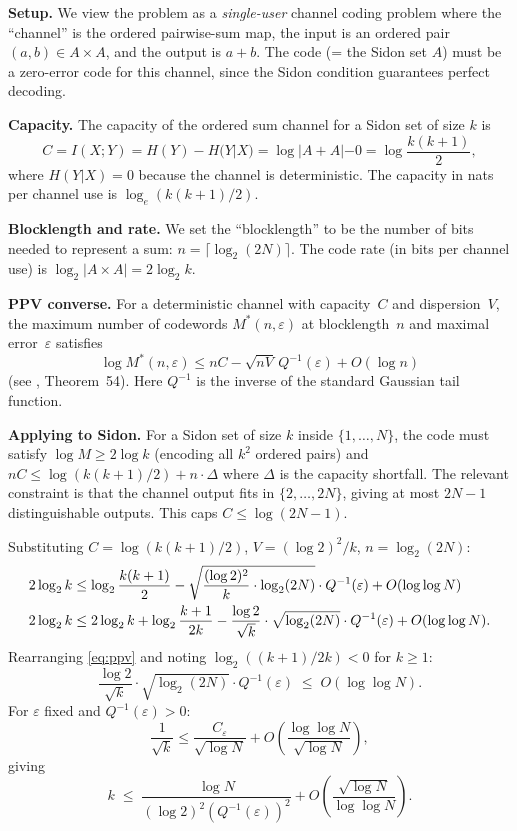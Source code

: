 \documentclass[11pt]{amsart}
\theoremstyle{plain}
\theoremstyle{definition}
\theoremstyle{remark}
\begin{document}
\textbf{Setup.} We view the problem as a \emph{single-user} channel coding
problem where the ``channel'' is the ordered pairwise-sum map, the input
is an ordered pair $(a,b) \in A \times A$, and the output is $a+b$.  The
code (= the Sidon set $A$) must be a zero-error code for this channel,
since the Sidon condition guarantees perfect decoding.

\textbf{Capacity.} The capacity of the ordered sum channel for a Sidon set
of size $k$ is
\[
  C = I(X;Y) = H(Y) - H(Y|X) = \log|A+A| - 0 = \log\frac{k(k+1)}{2},
\]
where $H(Y|X) = 0$ because the channel is deterministic.  The capacity in
nats per channel use is $\log_e(k(k+1)/2)$.

\textbf{Blocklength and rate.} We set the ``blocklength'' to be the number
of bits needed to represent a sum: $n = \lceil\log_2(2N)\rceil$.  The
code rate (in bits per channel use) is $\log_2|A \times A| = 2\log_2 k$.

\textbf{PPV converse.} For a deterministic channel with capacity~$C$ and
dispersion~$V$, the maximum number of codewords $M^*(n,\varepsilon)$ at
blocklength~$n$ and maximal error~$\varepsilon$ satisfies
\[
  \log M^*(n,\varepsilon) \le nC - \sqrt{nV}\,Q^{-1}(\varepsilon) + O(\log n)
\]
(see \cite{ppv_2010}, Theorem~54).  Here $Q^{-1}$ is the inverse of the
standard Gaussian tail function.

\textbf{Applying to Sidon.} For a Sidon set of size $k$ inside
$\{1,\ldots,N\}$, the code must satisfy $\log M \ge 2\log k$ (encoding
all $k^2$ ordered pairs) and $nC \le \log(k(k+1)/2) + n \cdot \Delta$
where $\Delta$ is the capacity shortfall.  The relevant constraint is that
the channel output fits in $\{2,\ldots,2N\}$, giving at most $2N-1$
distinguishable outputs.  This caps $C \le \log(2N-1)$.

Substituting $C = \log(k(k+1)/2)$, $V = (\log 2)^2/k$, $n = \log_2(2N)$:
\begin{align}
  2\log_2 k &\le \log_2\frac{k(k+1)}{2}
               - \sqrt{\frac{(\log 2)^2}{k} \cdot \log_2(2N)}\cdot Q^{-1}(\varepsilon)
               + O(\log\log N) \notag \\
  2\log_2 k &\le 2\log_2 k + \log_2\frac{k+1}{2k}
               - \frac{\log 2}{\sqrt{k}}\cdot\sqrt{\log_2(2N)}\cdot Q^{-1}(\varepsilon)
               + O(\log\log N). \label{eq:ppv}
\end{align}
Rearranging \eqref{eq:ppv} and noting $\log_2((k+1)/2k) < 0$ for $k \ge 1$:
\[
  \frac{\log 2}{\sqrt{k}}\cdot\sqrt{\log_2(2N)}\cdot Q^{-1}(\varepsilon)
  \;\le\; O(\log\log N).
\]
For $\varepsilon$ fixed and $Q^{-1}(\varepsilon) > 0$:
\[
  \frac{1}{\sqrt{k}} \le \frac{C_\varepsilon}{\sqrt{\log N}} + O\!\left(\frac{\log\log N}{\sqrt{\log N}}\right),
\]
giving
\[
  k \;\le\; \frac{\log N}{(\log 2)^2 (Q^{-1}(\varepsilon))^2} + O\!\left(\frac{\sqrt{\log N}}{\log\log N}\right).
\]
\end{document}

